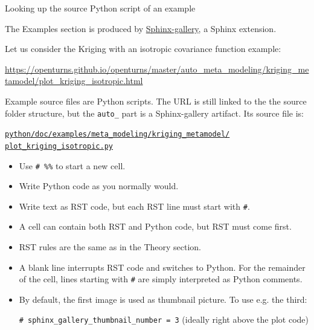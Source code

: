 \documentclass[8pt]{beamer}
\begin{document}
\begin{frame}{Looking up the source Python script of an example}

The Examples section is produced by \href{https://sphinx-gallery.github.io/stable/index.html}{\alert{Sphinx-gallery}}, a Sphinx extension.

Let us consider the \alert{Kriging with an isotropic covariance function} example:

\url{https://openturns.github.io/openturns/master/auto_meta_modeling/kriging_metamodel/plot_kriging_isotropic.html}

Example source files are \alert{Python scripts}.
The URL is still linked to the the source folder structure,
but the \texttt{auto\_} part is a Sphinx-gallery artifact. Its source file is:

\href{https://github.com/openturns/openturns/blob/master/python/doc/examples/meta_modeling/kriging_metamodel/plot_kriging_isotropic.py}{\texttt{python/doc/examples/meta\_modeling/kriging\_metamodel/\\plot\_kriging\_isotropic.py}}

\begin{itemize}
    \item Use \alert{\texttt{\# \%\%}} to start a \alert{new cell}.
    \item Write \alert{Python code} as you \alert{normally} would.
    \item Write \alert{text as RST code}, but each RST line must start with \alert{\texttt{\#}}.
    \item A cell can contain both RST and Python code, but \alert{RST must come first}.  
    \item \alert{RST rules are the same} as in the Theory section.
    \item A \alert{blank line} interrupts RST code and \alert{switches to Python}. For the remainder of the cell, lines starting with \alert{\texttt{\#}} are simply interpreted as Python comments.
    \item By default, the first image is used as \alert{thumbnail picture}. To use e.g. the third: %

    \texttt{\# sphinx\_gallery\_thumbnail\_number = 3} (ideally right above the plot code)
\end{itemize}

\end{frame}
\end{document}

